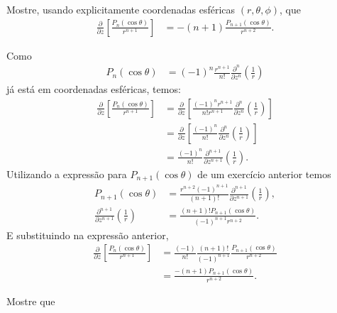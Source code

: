 \documentclass[a4paper,12pt, leqno, answers]{exam}
\begin{document}
\begin{questions}
    \question[E de 2012] Mostre, usando explicitamente coordenadas esf\'{e}ricas $(r, \theta, \phi)$, que
    \begin{align*}
        \frac{\partial}{\partial z} \left[ \frac{P_n(\cos \theta)}{r^{n + 1}} \right] &= - (n + 1) \frac{P_{n + 1}(\cos \theta)}{r^{n + 2}}.
    \end{align*}
    \begin{solution}
        Como
        \begin{align*}
            P_n(\cos \theta) &= (-1)^n \frac{r^{n + 1}}{n!} \frac{\partial^n}{\partial z^n}\left( \frac{1}{r} \right)
        \end{align*}
        j\'{a} est\'{a} em coordenadas esf\'{e}ricas, temos:
        \begin{align*}
            \frac{\partial}{\partial z}\left[ \frac{P_n(\cos \theta)}{r^{n + 1}} \right] &= \frac{\partial}{\partial z}\left[ \frac{(-1)^n r^{n + 1}}{n! r^{n + 1}} \frac{\partial^n}{\partial z^n}\left( \frac{1}{r} \right) \right] \\
            &= \frac{\partial}{\partial z}\left[ \frac{(-1)^n}{n!} \frac{\partial^n}{\partial z^n}\left( \frac{1}{r} \right) \right] \\
            &= \frac{(-1)^n}{n!} \frac{\partial^{n + 1}}{\partial z^{n + 1}}\left( \frac{1}{r} \right). 
        \end{align*}
        Utilizando a express\~{a}o para $P_{n + 1}(\cos \theta)$ de um exerc\'{i}cio anterior temos
        \begin{align*}
            P_{n + 1}(\cos \theta) &= \frac{r^{n + 2} (-1)^{n + 1}}{(n + 1)!} \frac{\partial^{n + 1}}{\partial z^{n + 1}}\left( \frac{1}{r} \right), \\
            \frac{\partial^{n + 1}}{\partial z^{n + 1}}\left( \frac{1}{r} \right) &= \frac{(n + 1)! P_{n + 1}(\cos \theta)}{(-1)^{n + 1} r^{n + 2}}.
        \end{align*}
        E substituindo na express\~{a}o anterior,
        \begin{align*}
            \frac{\partial}{\partial z}\left[ \frac{P_n(\cos \theta)}{r^{n + 1}} \right] &= \frac{(-1)}{n!} \frac{(n + 1)!}{(-1)^{n + 1}} \frac{P_{n + 1}(\cos \theta)}{r^{n + 2}} \\
            &= \frac{-(n + 1) P_{n + 1}(\cos \theta)}{r^{n + 2}}.
        \end{align*}
    \end{solution}

    \question Mostre que
    \begin{parts}

\end{parts}
\end{questions}
\end{document}

